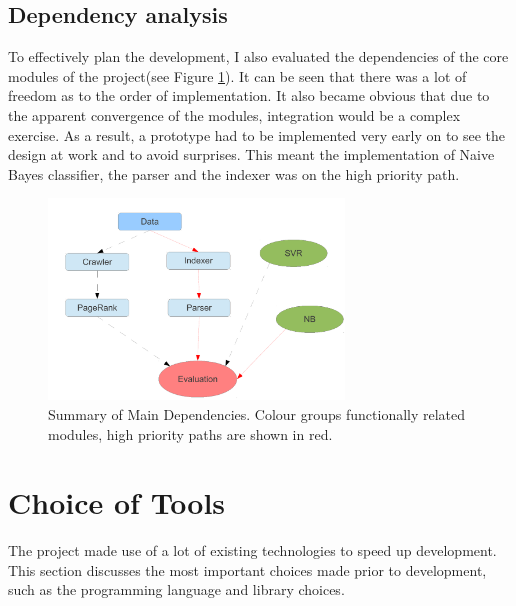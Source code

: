 \documentclass[12pt,a4paper,notitlepage,twoside]{scrbook}
\begin{document}
\subsection{Dependency analysis}
To effectively plan the development, I also evaluated the dependencies of the core modules
of the project(see Figure \ref{dep}). It
can be seen that there was a lot of freedom as to the order of implementation. It also
became obvious that due to the apparent convergence of the modules, integration would be a
complex exercise. As a result, a prototype had to be implemented very early on to see the
design at work and to avoid surprises. This meant the implementation of Naive Bayes
classifier, the parser and the indexer was on the high priority path.
\begin{figure}[h!]
	\centering
	\includegraphics[width=0.7\textwidth]{figs/dep.pdf}
	\caption{Summary of Main Dependencies. Colour groups functionally related modules,
		high priority paths are shown in red.\label{dep}}
\end{figure}

\section{Choice of Tools}
The project made use of a lot of existing technologies to speed up development. This
section discusses the most important choices made prior to development, such as the
programming language and library choices.
\end{document}
